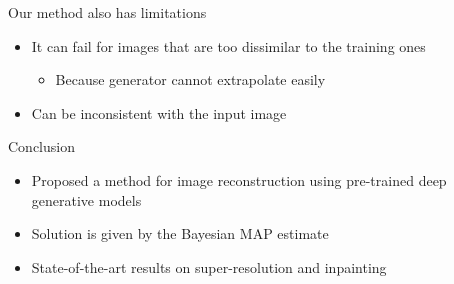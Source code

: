\begin{frame}{Our method also has limitations}

\begin{itemize}
 \item It can fail for images that are too dissimilar to the training ones
 \begin{itemize}
 \item Because generator cannot extrapolate easily
 \end{itemize}
 \begin{center}
 \end{center}
 
 \item Can be inconsistent with the input image
 \begin{center}
 \end{center}
 
\end{itemize}
 
\end{frame}


\begin{frame}{Conclusion}
 
 \begin{itemize}
  \item Proposed a method for image reconstruction using pre-trained deep generative models
  \item Solution is given by the Bayesian MAP estimate
  \item State-of-the-art results on super-resolution and inpainting
  
 \end{itemize}

 
\end{frame}




